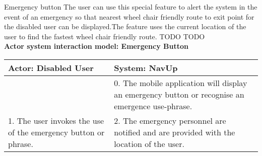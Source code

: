\FuncReq
{Emergency button }
{The user can use this special feature to alert the system in the event of an emergency so that nearest wheel chair friendly route to exit point for the disabled user can be displayed.The feature uses the current location of the user to find the fastest wheel chair friendly route.}
{TODO}
{TODO}
    \\
    \textbf{Actor system interaction model: Emergency Button}\\
    \begin{tabular}{ | p{6cm} | p{6cm} |}
    \hline
    Actor: Disabled User & System: NavUp \\ \hline
     & 0. The mobile application will display an emergency button or recognise an emergence use-phrase.\\ \hline
    1. The user invokes the use of the emergency button or phrase. & 2. The emergency personnel are notified and are provided with the location of the user.\\ \hline   
    \end{tabular}
\\
\bigskip
